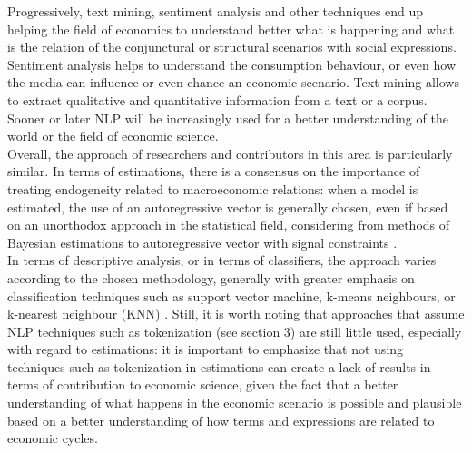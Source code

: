 Progressively, text mining, sentiment analysis and other techniques end up helping the field of economics to understand better what is happening and what is the relation of the conjunctural or structural scenarios with social expressions. Sentiment analysis helps to understand the consumption behaviour, or even how the media can influence or even chance an economic scenario. Text mining allows to extract qualitative and quantitative information from a text or a corpus. Sooner or later NLP will be increasingly used for a better understanding of the world or the field of economic science.\\

Overall, the approach of researchers and contributors in this area is particularly similar. In terms of estimations, there is a consensus on the importance of treating endogeneity related to macroeconomic relations: when a model is estimated, the use of an autoregressive vector is generally chosen, even if based on an unorthodox approach in the statistical field, considering from methods of Bayesian estimations to autoregressive vector with signal constraints \citet{santos2020indice}.\\

In terms of descriptive analysis, or in terms of classifiers, the approach varies according to the chosen methodology, generally with greater emphasis on classification techniques such as support vector machine, k-means neighbours, or k-nearest neighbour (KNN) \citet{ostapenko2020macroeconomic}. Still, it is worth noting that approaches that assume NLP techniques such as tokenization (see section 3) are still little used, especially with regard to estimations: it is important to emphasize that not using techniques such as tokenization in estimations can create a lack of results in terms of contribution to economic science, given the fact that a better understanding of what happens in the economic scenario is possible and plausible based on a better understanding of how terms and expressions are related to economic cycles.\\



